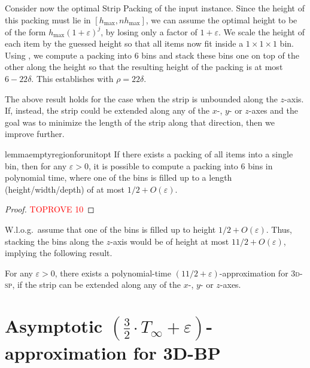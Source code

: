 \documentclass[a4paper,UKenglish,cleveref, autoref, thm-restate]{lipics-v2021}
\newcommand{\eps}{\varepsilon}
\newcommand{\tsp}{\textsc{3d-sp}\xspace}
\begin{document}
Consider now the optimal Strip Packing of the input instance. Since the height of this packing must lie in $[h_{\text{max}},nh_{\text{max}}]$, we can assume the optimal height to be of the form $h_{\text{max}}(1+\varepsilon)^j$, by losing only a factor of $1+\varepsilon$. We scale the height of each item by the guessed height so that all items now fit inside a $1\times 1\times 1$ bin. Using , we compute a packing into 6 bins and stack these bins one on top of the other along the height so that the resulting height of the packing is at most $6-22\delta$. This establishes  with $\rho = 22\delta$.

The above result holds for the case when the strip is unbounded along the $z$-axis. If, instead, the strip could be extended along any of the $x$-, $y$- or $z$-axes and the goal was to minimize the length of the strip along that direction, then we improve further.

\begin{restatable}{lemma}{emptyregionforunitopt}
\label{lem:emptyregionforunitopt}
    If there exists a packing of all items into a single bin, then for any $\varepsilon >0$, it is possible to compute a packing into 6 bins in polynomial time, where one of the bins is filled up to a length (height/width/depth) of at most $1/2+O(\varepsilon)$.
\end{restatable}
\begin{proof}\textcolor{red}{TOPROVE 10}\end{proof}

W.l.o.g.~assume that one of the bins is filled up to height $1/2+O(\eps)$. Thus, stacking the bins along the $z$-axis would be of height at most $11/2+O(\eps)$, implying the following result.

\begin{corollary}
\label{cor:spwithdirection}
    For any $\varepsilon > 0$, there exists a polynomial-time $(11/2+\varepsilon)$-approximation for \tsp, if the strip can be extended along any of the $x$-, $y$- or $z$-axes.
\end{corollary}







\section{Asymptotic \texorpdfstring{$(\frac{3}{2}\cdot T_{\infty}+\eps)$}{near three-half}-approximation for 3D-BP}
\label{sec:asymptotic}
\end{document}
